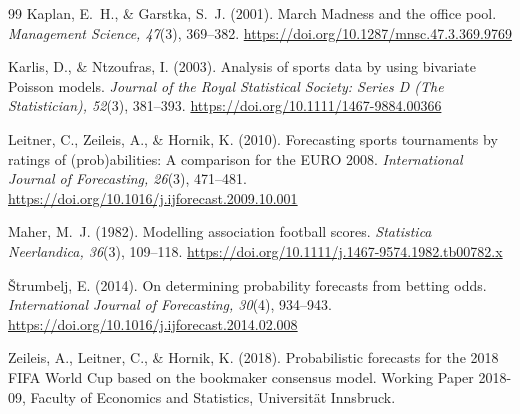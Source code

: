 \documentclass[11pt,letterpaper]{article}
\begin{document}
\begin{thebibliography}{99}
Kaplan, E.~H., \& Garstka, S.~J. (2001). March Madness and the office pool. \emph{Management Science, 47}(3), 369--382. \url{https://doi.org/10.1287/mnsc.47.3.369.9769}

Karlis, D., \& Ntzoufras, I. (2003). Analysis of sports data by using bivariate Poisson models. \emph{Journal of the Royal Statistical Society: Series D (The Statistician), 52}(3), 381--393. \url{https://doi.org/10.1111/1467-9884.00366}

Leitner, C., Zeileis, A., \& Hornik, K. (2010). Forecasting sports tournaments by ratings of (prob)abilities: A comparison for the EURO 2008. \emph{International Journal of Forecasting, 26}(3), 471--481. \url{https://doi.org/10.1016/j.ijforecast.2009.10.001}

Maher, M.~J. (1982). Modelling association football scores. \emph{Statistica Neerlandica, 36}(3), 109--118. \url{https://doi.org/10.1111/j.1467-9574.1982.tb00782.x}

Štrumbelj, E. (2014). On determining probability forecasts from betting odds. \emph{International Journal of Forecasting, 30}(4), 934--943. \url{https://doi.org/10.1016/j.ijforecast.2014.02.008}

Zeileis, A., Leitner, C., \& Hornik, K. (2018). Probabilistic forecasts for the 2018 FIFA World Cup based on the bookmaker consensus model. Working Paper 2018-09, Faculty of Economics and Statistics, Universität Innsbruck.

\end{thebibliography}
\end{document}
